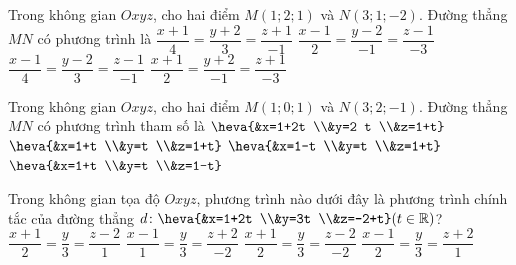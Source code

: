 \begin{ex}Trong không gian $Oxyz$, cho hai điểm $M(1; 2; 1)$ và $N(3; 1;-2)$. Đường thẳng $MN$ có phương trình là
	\choice
	{$\dfrac{x+1}{4}=\dfrac{y+2}{3}=\dfrac{z+1}{-1}$}
	{\True $\dfrac{x-1}{2}=\dfrac{y-2}{-1}=\dfrac{z-1}{-3}$}
	{$\dfrac{x-1}{4}=\dfrac{y-2}{3}=\dfrac{z-1}{-1}$}
	{$\dfrac{x+1}{2}=\dfrac{y+2}{-1}=\dfrac{z+1}{-3}$}
\end{ex}
\begin{ex}Trong không gian $Oxyz$, cho hai điểm $M(1; 0; 1)$ và $N(3; 2;-1)$. Đường thẳng $MN$ có phương trình tham số là
	\choice
	{$\heva{&x=1+2t \\&y=2 t \\&z=1+t}$}
	{$\heva{&x=1+t \\&y=t \\&z=1+t}$}
	{$\heva{&x=1-t \\&y=t \\&z=1+t}$}
	{\True $\heva{&x=1+t \\&y=t \\&z=1-t}$}
\end{ex}
\begin{ex}Trong không gian tọa độ $Oxyz$, phương trình nào dưới đây là phương trình chính tắc của đường thẳng $d\colon\heva{&x=1+2t \\&y=3t \\&z=-2+t}(t\in \mathbb{R})$?
	\choice
	{$\dfrac{x+1}{2}=\dfrac{y}{3}=\dfrac{z-2}{1}$}
	{$\dfrac{x-1}{1}=\dfrac{y}{3}=\dfrac{z+2}{-2}$}
	{$\dfrac{x+1}{2}=\dfrac{y}{3}=\dfrac{z-2}{-2}$}
	{\True $\dfrac{x-1}{2}=\dfrac{y}{3}=\dfrac{z+2}{1}$}
\end{ex}
